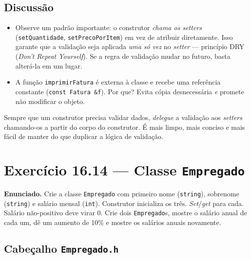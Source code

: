 \documentclass[11pt,a4paper]{article}
\begin{document}
\subsection*{Discuss\~ao}

\begin{itemize}[leftmargin=*]
  \item Observe um padr\~ao importante: o construtor \emph{chama os setters} (\texttt{setQuantidade}, \texttt{setPrecoPorItem}) em vez de atribuir diretamente. Isso garante que a valida\c{c}\~ao seja aplicada \emph{uma s\'o vez} no \emph{setter} --- princ\'ipio DRY (\emph{Don't Repeat Yourself}). Se a regra de valida\c{c}\~ao mudar no futuro, basta alter\'a-la em um lugar.
  \item A fun\c{c}\~ao \texttt{imprimirFatura} \'e externa \`a classe e recebe uma refer\^encia constante (\texttt{const Fatura \&f}). Por que? Evita c\'opia desnecess\'aria \emph{e} promete n\~ao modificar o objeto.
\end{itemize}

\begin{boaprat}
Sempre que um construtor precisa validar dados, \emph{delegue} a valida\c{c}\~ao aos \emph{setters} chamando-os a partir do corpo do construtor. \'E mais limpo, mais conciso e mais f\'acil de manter do que duplicar a l\'ogica de valida\c{c}\~ao.
\end{boaprat}

\newpage
\section{Exerc\'icio 16.14 --- Classe \texttt{Empregado}}

\begin{enunciado}
\textbf{Enunciado.} Crie a classe \texttt{Empregado} com primeiro nome (\texttt{string}), sobrenome (\texttt{string}) e sal\'ario mensal (\texttt{int}). Construtor inicializa os tr\^es. \emph{Set}/\emph{get} para cada. Sal\'ario n\~ao-positivo deve virar 0. Crie dois \texttt{Empregado}s, mostre o sal\'ario anual de cada um, d\^e um aumento de 10\% e mostre os sal\'arios anuais novamente.
\end{enunciado}

\subsection*{Cabe\c{c}alho \texttt{Empregado.h}}
\end{document}
